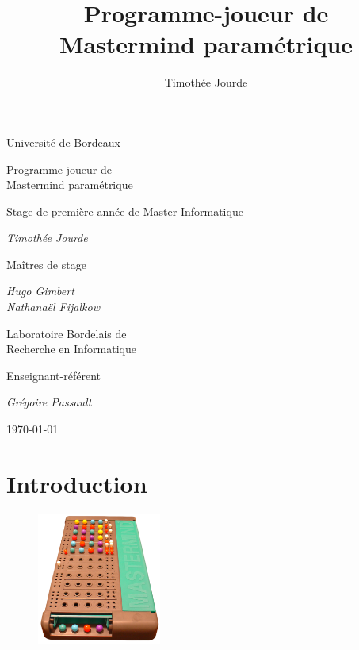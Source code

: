 \documentclass[a4paper]{article}
\title{Programme-joueur de \\ Mastermind paramétrique}
\author{Timothée Jourde}
\renewcommand{\(}{\begin{math}\color{brick}}
\renewcommand{\)}{\end{math}}
\newcommand{\ttl}[1]{{\Large\color{brick}#1}}
\newcommand{\vsp}{\vspace{0.3cm}}
\begin{document}
\setlength{\abovedisplayskip}{0pt}
\setlength{\belowdisplayskip}{0pt}
\setlength{\abovedisplayshortskip}{0pt}
\setlength{\belowdisplayshortskip}{0pt}



\begin{titlepage}
  \centering
  \large

  {
    Université de Bordeaux
  }
  
  \vfill

  {
    \ttl{\Huge Programme-joueur de \\ Mastermind paramétrique}
    
    \ttl{Stage de première année de Master Informatique}
  }
  
  \vfill

  {
    \textit{Timothée Jourde}
  }
         
  \vfill

  {
    \ttl{Maîtres de stage}
    
    \vsp
    
    \textit{Hugo Gimbert \\ Nathanaël Fijalkow}
    
    \vsp
    
    Laboratoire Bordelais de \\ Recherche en Informatique
  }
  
  \vfill

  {
    \ttl{Enseignant-référent}
    
    \vsp
    
    \textit{Grégoire Passault}
  }
  
  \vfill

  {
    \today
  }
\end{titlepage}

\clearpage

{\color{brick}\tableofcontents}

\section{Introduction}

\begin{figure}
  \vspace{-\baselineskip}
  \includegraphics[width=11em]{mastermind.png}
\end{figure}
\end{document}
